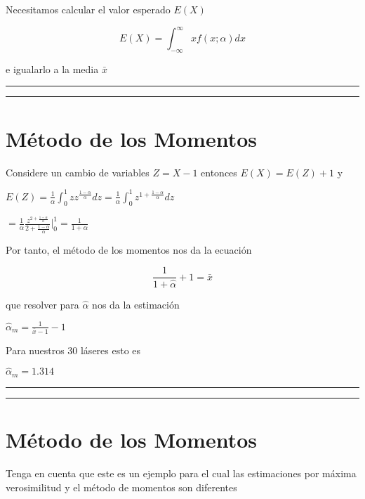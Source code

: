 \documentclass[
]{book}
\begin{document}
Necesitamos calcular el valor esperado \(E(X)\)

\[E(X)=\int_{-\infty}^{\infty} x f(x;\alpha)dx\]

e igualarlo a la media \(\bar{x}\)

\begin{center}\rule{0.5\linewidth}{0.5pt}\end{center}

\begin{center}\rule{0.5\linewidth}{0.5pt}\end{center}

\hypertarget{muxe9todo-de-los-momentos-9}{%
\section{Método de los Momentos}\label{muxe9todo-de-los-momentos-9}}

Considere un cambio de variables \(Z=X-1\) entonces \(E(X)=E(Z)+1\) y

\(E(Z)= \frac{1}{\alpha} \int_0^1 z z^{\frac{1-\alpha}{\alpha}}dz= \frac{1}{\alpha} \int_0^1 z^{1+\frac{1-\alpha}{\alpha}}dz\)

\(= \frac{1}{\alpha} \frac{z^{2+\frac{1-\alpha}{\alpha}}}{{2+\frac{1-\alpha}{\alpha}} } |_0^1=\frac{1}{1+\alpha}\)

Por tanto, el método de los momentos nos da la ecuación

\[\frac{1}{1+\hat{\alpha}}+1=\bar{x}\]

que resolver para \(\hat{\alpha}\) nos da la estimación

\(\hat{\alpha}_m=\frac{1}{\bar{x}-1}-1\)

Para nuestros 30 láseres esto es

\(\hat{\alpha}_m=1.314\)

\begin{center}\rule{0.5\linewidth}{0.5pt}\end{center}

\begin{center}\rule{0.5\linewidth}{0.5pt}\end{center}

\hypertarget{muxe9todo-de-los-momentos-10}{%
\section{Método de los Momentos}\label{muxe9todo-de-los-momentos-10}}

Tenga en cuenta que este es un ejemplo para el cual las estimaciones por máxima verosimilitud y el método de momentos son diferentes
\end{document}
